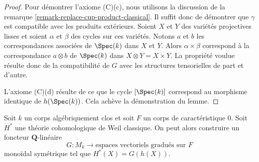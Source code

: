 \begin{proof}
\medskip\noindent
Pour démontrer l'axiome (C)(c), nous utilisons la discussion de
la remarque \ref{remark-replace-cup-product-classical}.
Il suffit donc de démontrer que $\gamma$ est compatible avec
les produits extérieurs. Soient $X$ et $Y$ des variétés projectives lisses
et soient $\alpha$ et $\beta$ des cycles sur ces variétés. Notons
$a$ et $b$ les correspondances associées de $\Spec(k)$ dans
$X$ et $Y$. Alors $\alpha \times \beta$ correspond à
la correspondance $a \otimes b$ de $\Spec(k)$ dans $X \otimes Y = X \times Y$.
La propriété voulue résulte donc de la compatibilité de $G$
avec les structures tensorielles de part et d'autre.

\medskip\noindent
L'axiome (C)(d) résulte de ce que le cycle $[\Spec(k)]$
correspond au morphisme identique de $h(\Spec(k))$.
Cela achève la démonstration du lemme.
\end{proof}

\begin{lemma}
\label{lemma-from-weil-to-functor-classical}
Soit $k$ un corps algébriquement clos et soit $F$ un corps de
caractéristique $0$. Soit $H^*$ une théorie cohomologique de Weil classique.
On peut alors construire un foncteur $\mathbf{Q}$-linéaire
$$
G : M_k \longrightarrow \text{espaces vectoriels gradués sur }F\text{}
$$
monoïdal symétrique tel que $H^*(X) = G(h(X))$.
\end{lemma}

